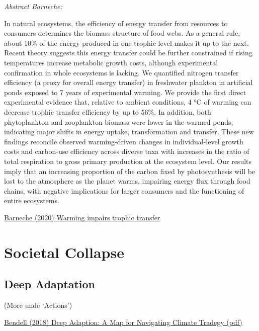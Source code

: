 \documentclass[
]{book}
\begin{document}
\emph{Abstract Barneche:}

In natural ecosystems, the efficiency of energy transfer from resources to consumers
determines the biomass structure of food webs.
As a general rule, about 10\% of the energy produced in one trophic level makes it up to the next.
Recent theory suggests this energy transfer could be further constrained
if rising temperatures increase metabolic growth costs,
although experimental confirmation in whole ecosystems is lacking.
We quantified nitrogen transfer efficiency (a proxy for overall energy transfer)
in freshwater plankton in artificial ponds exposed to 7 years of experimental warming.
We provide the first direct experimental evidence that, relative to ambient conditions,
4 °C of warming can decrease trophic transfer efficiency by up to 56\%.
In addition, both phytoplankton and zooplankton biomass were lower in the warmed ponds,
indicating major shifts in energy uptake, transformation and transfer.
These new findings reconcile observed warming-driven changes in individual-level growth costs
and carbon-use efficiency across diverse taxa
with increases in the ratio of total respiration to gross primary production at the ecosystem level.
Our results imply that an increasing proportion of the carbon fixed by photosynthesis
will be lost to the atmosphere as the planet warms,
impairing energy flux through food chains,
with negative implications for larger consumers and the functioning of entire ecosystems.

\href{https://www.nature.com/articles/s41586-021-03352-2.epdf?sharing_token=en8G_PplC0NZ0bhBexd-sNRgN0jAjWel9jnR3ZoTv0Ocz1xjDcPWe-XYsQ6aAwENGLYkqI0ZtDZNzNTVzQDqzZn-V1IKe1zVtdJyDa_OeTOMHVBxxTmAVAdf8C0XWZFeT5VbXvvLwC4vezF-pqJafKF8PZc0_EjTPOG1MccecjM\%3D}{Barneche (2020) Warming impairs trophic transfer}

\hypertarget{societal-collapse}{%
\chapter{Societal Collapse}\label{societal-collapse}}

\hypertarget{deep-adaptation}{%
\section{Deep Adaptation}\label{deep-adaptation}}

(More unde `Actions')

\href{pdf/\%20Bendell_2020_Deep_Adaptation.pdf}{Bendell (2018) Deep Adaption: A Map for Navigating Climate Tradegy (pdf)}
\end{document}
